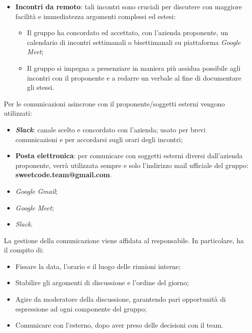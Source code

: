 \documentclass[10pt, a4paper]{article}
\begin{document}

\begin{itemize}
   

\item \textbf{Incontri da remoto}: tali incontri sono cruciali per discutere con maggiore facilità e immediatezza argomenti complessi 
ed estesi:
\begin{itemize}
    \item Il gruppo ha concordato ed accettato, con l'azienda proponente, un calendario di incontri settimanali o bisettimanali su 
    piattaforma \textit{Google Meet};
    \item  Il gruppo si impegna a presenziare in maniera più assidua possibile agli incontri con il proponente e a redarre un verbale al fine di documentare gli stessi.
\end{itemize}
\end{itemize}
  

Per le comunicazioni asincrone con il proponente/soggetti esterni vengono utilizzati:
\begin{itemize}
    \item \textbf{\textit{Slack}}: canale scelto e concordato con l'azienda; usato per brevi comunicazioni e per accordarsi sugli orari degli incontri;
    \item \textbf{Posta elettronica}: per comunicare con soggetti esterni diversi dall'azienda proponente, verrà utilizzata sempre e solo l'indirizzo mail ufficiale del gruppo: 
    \textbf{sweetcode.team@gmail.com}.
    
\end{itemize}


\begin{itemize}
    \item \textit{Google Gmail};
    \item \textit{Google Meet};
    \item \textit{Slack}.
\end{itemize}

La gestione della comunicazione viene affidata al responsabile. In particolare, ha il compito di:
\begin{itemize}
    \item Fissare la data, l'orario e il luogo delle riunioni interne;
    \item Stabilire gli argomenti di discussione e l'ordine del giorno;
    \item Agire da moderatore della discussione, garantendo pari opportunità di espressione ad ogni componente del gruppo;
    \item Comunicare con l'esterno, dopo aver preso delle decisioni con il team. 
\end{itemize}
\end{document}
